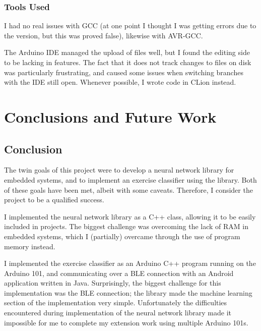 \documentclass[a4paper]{article}
\begin{document}
\subsubsection{Tools Used}
\label{subsubsec:ev_pm_tools}

I had no real issues with GCC (at one point I thought I was getting errors due to the version, but this was proved false), likewise with AVR-GCC.

The Arduino IDE managed the upload of files well, but I found the editing side to be lacking in features.  The fact that it does not track changes to files on disk was particularly frustrating, and caused some issues when switching branches with the IDE still open. Whenever possible, I wrote code in CLion instead.

\newpage
\section{Conclusions and Future Work}
\label{sec:fw}

\subsection{Conclusion}%
\label{subsec:fw_conclusion}

The twin goals of this project were to develop a neural network library for embedded systems, and to implement an exercise classifier using the library. Both of these goals have been met, albeit with some caveats. Therefore, I consider the project to be a qualified success.

I implemented the neural network library as a C++ class, allowing it to be easily included in projects. The biggest challenge was overcoming the lack of RAM in embedded systems, which I (partially) overcame through the use of program memory instead. 

I implemented the exercise classifier as an Arduino C++ program running on the Arduino 101, and communicating over a BLE connection with an Android application written in Java. 
Surprisingly, the biggest challenge for this implementation was the BLE connection; the library made the machine learning section of the implementation very simple.
Unfortunately the difficulties encountered during implementation of the neural network library made it impossible for me to complete my extension work using multiple Arduino 101s.
\end{document}
